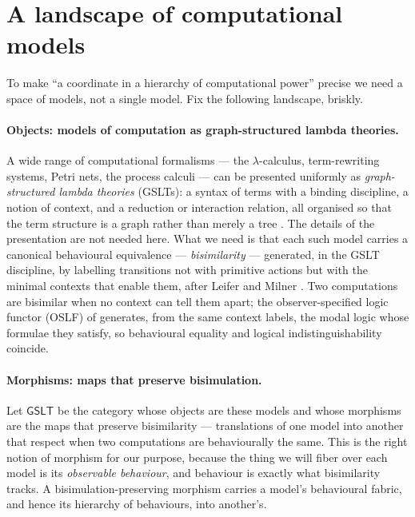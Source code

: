 \documentclass[11pt]{article}
\theoremstyle{definition}
\theoremstyle{plain}
\theoremstyle{remark}
\newcommand{\GSLT}{\mathsf{GSLT}}
\begin{document}
\section{A landscape of computational models}\label{sec:landscape}

To make ``a coordinate in a hierarchy of computational power'' precise we need a
space of models, not a single model. Fix the following landscape, briskly.

\paragraph{Objects: models of computation as graph-structured lambda theories.}
A wide range of computational formalisms --- the $\lambda$-calculus, term-rewriting
systems, Petri nets, the process calculi --- can be presented uniformly as
\emph{graph-structured lambda theories} (GSLTs): a syntax of terms with a binding
discipline, a notion of context, and a reduction or interaction relation, all
organised so that the term structure is a graph rather than merely a tree
\cite{oslf}. The details of the presentation are not needed here. What we need is
that each such model carries a canonical behavioural equivalence ---
\emph{bisimilarity} --- generated, in the GSLT discipline, by labelling transitions
not with primitive actions but with the minimal contexts that enable them, after
Leifer and Milner \cite{leifermilner,sewell}. Two computations are bisimilar when
no context can tell them apart; the observer-specified logic functor (OSLF) of
\cite{oslf} generates, from the same context labels, the modal logic whose formulae
they satisfy, so behavioural equality and logical indistinguishability coincide.

\paragraph{Morphisms: maps that preserve bisimulation.}
Let $\GSLT$ be the category whose objects are these models and whose morphisms are
the maps that preserve bisimilarity --- translations of one model into another that
respect when two computations are behaviourally the same. This is the right notion
of morphism for our purpose, because the thing we will fiber over each model is its
\emph{observable behaviour}, and behaviour is exactly what bisimilarity tracks. A
bisimulation-preserving morphism carries a model's behavioural fabric, and hence its
hierarchy of behaviours, into another's.
\end{document}
